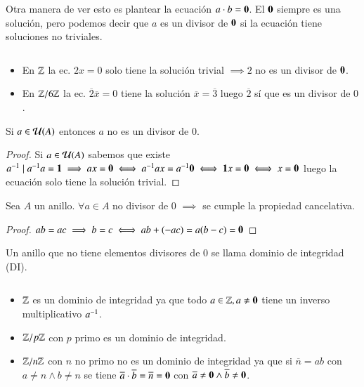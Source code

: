 Otra manera de ver esto es plantear la ecuación $a \cdot b = \mathbf{0}$. El $\mathbf{0}$ siempre es una solución, pero podemos decir que $a$ es un divisor de $\mathbf{0}$ si la ecuación tiene soluciones no triviales.

\begin{ej}$ $\newline
	\begin{itemize}
		\item En $\mathbb{Z}$ la ec. $2x = 0$ solo tiene la solución trivial $\implies 2$ no es un divisor de $\mathbf{0}$.
		\item En $\mathbb{Z}/6\mathbb{Z}$ la ec. $\overline{2}\overline{x} = 0$ tiene la solución $\overline{x} = \overline{3}$ luego $\overline{2}$ sí que es un divisor de $0$.
	\end{itemize}
\end{ej}

\begin{pro}
	Si $a \in \mathcal{U}(A)$ entonces $a$ no es un divisor de $0$.
\end{pro}

\begin{proof}
	Si $a \in \mathcal{U}(A)$ sabemos que existe $a^{-1} \mid a^{-1}a = \mathbf{1} \implies ax = \mathbf{0} \iff a^{-1}ax = a^{-1} \mathbf{0} \iff \mathbf{1} x = \mathbf{0} \iff x = \mathbf{0}$ luego la ecuación solo tiene la solución trivial.
\end{proof}

\begin{pro}
	Sea $A$ un anillo. $\forall a \in A$ no divisor de 0 $\implies$ se cumple la propiedad cancelativa.
\end{pro}

\begin{proof}
	$ab = ac \implies b = c \iff ab + (-ac) = a(b -c) = \mathbf{0}$
\end{proof}

\begin{dfn}
	Un anillo que no tiene elementos divisores de 0 se llama dominio de integridad (DI).
\end{dfn}

\begin{ej}$ $\newline
	\begin{itemize}
		\item $\mathbb{Z}$ es un dominio de integridad ya que todo $a \in \mathbb{Z}, a \neq \mathbf{0}$ tiene un inverso multiplicativo $a^{-1}$.
		\item $\mathbb{Z}/p\mathbb{Z}$ con $p$ primo es un dominio de integridad.
		\item $\mathbb{Z}/n\mathbb{Z}$ con $n$ no primo no es un dominio de integridad ya que si $\overline n = ab$ con $a \neq n \land b \neq n$ se tiene $\overline{a} \cdot \overline{b} = \overline{n} = \mathbf{0}$ con $\overline{a} \neq \mathbf{0} \land \overline{b} \neq \mathbf{0}$.
	\end{itemize}
\end{ej}

